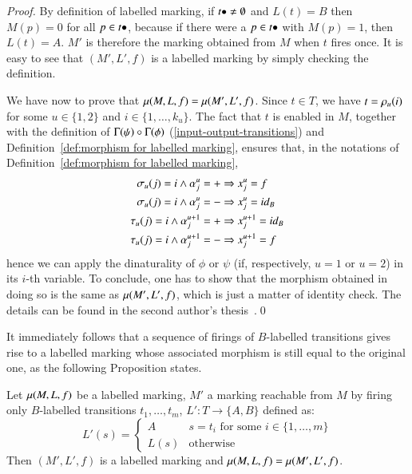 \begin{proof}
	By definition of labelled marking, if $\out t \ne \emptyset$ and $L(t) = B$ then $M(p) = 0$ for all $p \in \out t$, because if there were a $p \in \out t$ with $M(p) = 1$, then $L(t) = A$. $M'$ is therefore the marking obtained from $M$ when $t$ fires once. It is easy to see that $(M',L',f)$ is a labelled marking by simply checking the definition. 
	
	We have now to prove that $\mu(M,L,f) = \mu(M',L',f)$. Since $t \in T$, we have $t = \rho_{u} (i)$ for some $u \in \{1,2\}$ and $i \in \{1,\dots,k_u\}$. The fact that $t$ is enabled in $M$, together with the definition of $\graph\psi \circ \graph\phi$ (\ref{input-output-transitions}) and Definition~\ref{def:morphism for labelled marking}, ensures that, in the notations of Definition~\ref{def:morphism for labelled marking},
	\begin{align*}
	\sigma_u(j) = i \land \alpha^u_j = + &\Rightarrow x^u_j = f  \\
	\sigma_u(j) = i \land \alpha^u_j = - &\Rightarrow x^u_j = \mathop{\textit{id}_{B}} \\
	\tau_u(j) = i \land \alpha^{u+1}_j = + &\Rightarrow x^{u+1}_j = \mathop{\textit{id}_{B}} \\
	\tau_u(j) = i \land \alpha^{u+1}_j = - &\Rightarrow x^{u+1}_j = f 
	\end{align*}
	hence we can apply the dinaturality of $\phi$ or $\psi$ (if, respectively, $u=1$ or $u=2$) in its $i$-th variable. To conclude, one has to show that the morphism obtained in doing so is the same as $\mu(M',L',f)$, which is just a matter of identity check. The details can be found in the second author's thesis~\cite{santamaria_towards_2019}.\qed
\end{proof}

It immediately follows that a sequence of firings of $B$-labelled transitions gives rise to a labelled marking whose associated morphism is still equal to the original one, as the following Proposition states.

\begin{corollary}\label{cor:reachability-implies-equality}
	Let $\mu(M,L,f)$ be a labelled marking, $M'$ a marking reachable from $M$ by firing only $B$-labelled transitions $t_1,\dots,t_m$, $L' \colon T \to \{A,B\}$ defined as:
	\[
	L'(s) = \begin{cases}
	A & s = t_i \text{ for some $i \in \{1,\dots,m\}$} \\
	L(s) & \text{otherwise}
	\end{cases}
	\]
	Then $(M', L',f)$ is a labelled marking and $\mu(M,L,f) = \mu(M',L',f)$.
\end{corollary}

